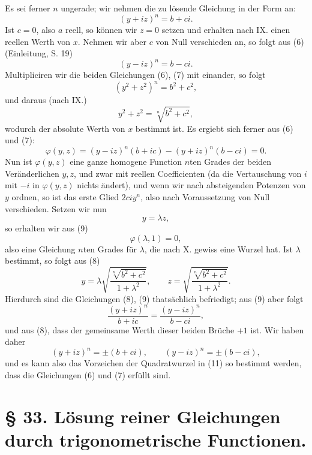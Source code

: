 \documentclass[11pt]{article}
\begin{document}
Es sei ferner $n$ ungerade; wir nehmen die zu lösende Gleichung in der Form an:
\begin{equation}
 (y+iz)^n=b+ci.
\tag{6}
\end{equation}
Ist $c=0$, also $a$ reell, so können wir $z=0$ setzen und erhalten nach IX. einen reellen Werth von $x$. Nehmen wir aber $c$ von Null verschieden an, so folgt aus (6) (Einleitung, S. 19)
\begin{equation}
 (y-iz)^n=b-ci.
\tag{7}
\end{equation}
Multipliciren wir die beiden Gleichungen (6), (7) mit einander, so folgt
\[
 (y^2+z^2)^n=b^2+c^2,
\]
und daraus (nach IX.)
\begin{equation}
 y^2+z^2=\sqrt[n]{b^2+c^2},
\tag{8}
\end{equation}
wodurch der absolute Werth von $x$ bestimmt ist. Es ergiebt sich ferner aus (6) und (7):
\begin{equation}
 \varphi(y,z)=(y-iz)^n(b+ic)-(y+iz)^n(b-ci)=0.
\tag{9}
\end{equation}
Nun ist $\varphi(y,z)$ eine ganze homogene Function $n$ten Grades der beiden Veränderlichen $y,z$, und zwar mit reellen Coefficienten (da die Vertauschung von $i$ mit $-i$ in $\varphi(y,z)$ nichts ändert), und wenn wir nach absteigenden Potenzen von $y$ ordnen, so ist das erste Glied $2ciy^n$, also nach Voraussetzung von Null verschieden. Setzen wir nun
\[
 y=\lambda z,
\]
so erhalten wir aus (9)
\begin{equation}
 \varphi(\lambda,1)=0,
\tag{10}
\end{equation}
also eine Gleichung $n$ten Grades für $\lambda$, die nach X. gewiss eine Wurzel hat. Ist $\lambda$ bestimmt, so folgt aus (8)
\begin{equation}
 y=\lambda\sqrt{\frac{\sqrt[n]{b^2+c^2}}{1+\lambda^2}},\qquad
 z=\sqrt{\frac{\sqrt[n]{b^2+c^2}}{1+\lambda^2}}.
\tag{11}
\end{equation}
Hierdurch sind die Gleichungen (8), (9) thatsächlich befriedigt; aus (9) aber folgt
\[
 \frac{(y+iz)^n}{b+ic}=\frac{(y-iz)^n}{b-ci},
\]
und aus (8), dass der gemeinsame Werth dieser beiden Brüche $+1$ ist. Wir haben daher
\[
 (y+iz)^n=\pm(b+ci),\qquad (y-iz)^n=\pm(b-ci),
\]
und es kann also das Vorzeichen der Quadratwurzel in (11) so bestimmt werden, dass die Gleichungen (6) und (7) erfüllt sind.

\section*{§ 33. Lösung reiner Gleichungen durch trigonometrische Functionen.}
\end{document}
